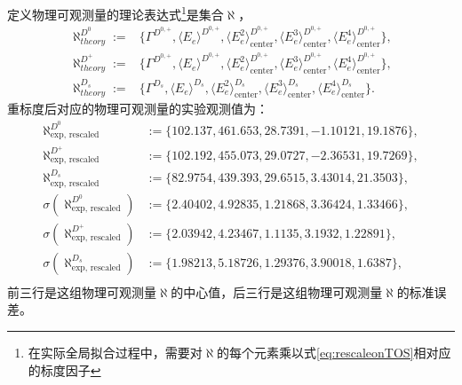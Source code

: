 定义物理可观测量的理论表达式\footnote{在实际全局拟合过程中，需要对$\aleph$的每个元素乘以式\eqref{eq:rescaleonTOS}相对应的标度因子}是集合$\aleph$，
\begin{equation}
    \begin{aligned}
        \aleph_{theory}^{D^{0}} := & \{\Gamma^{D^{0,+}}, \langle E_{e}\rangle^{D^{0,+}}, \langle E_{e}^2\rangle^{D^{0,+}}_{\text{center}}, \langle E_{e}^3\rangle^{D^{0,+}}_{\text{center}}, \langle E_{e}^4\rangle^{D^{0,+}}_{\text{center}}\}, \\
        \aleph_{theory}^{D^{+}} := & \{\Gamma^{D^{0,+}}, \langle E_{e}\rangle^{D^{0,+}}, \langle E_{e}^2\rangle^{D^{0,+}}_{\text{center}}, \langle E_{e}^3\rangle^{D^{0,+}}_{\text{center}}, \langle E_{e}^4\rangle^{D^{0,+}}_{\text{center}}\}, \\
        \aleph_{theory}^{D_s} := & \{\Gamma^{D_{s}},\langle E_{e}\rangle^{D_{s}}, \langle E_{e}^2\rangle^{D_{s}}_{\text{center}}, \langle E_{e}^3\rangle^{D_{s}}_{\text{center}}, \langle E_{e}^4\rangle^{D_{s}}_{\text{center}}\}.
    \end{aligned}
    \label{eq:TOS}
\end{equation}
重标度后对应的物理可观测量的实验观测值为：
\begin{equation}
    \begin{aligned}
        \aleph_{\text{exp, rescaled}}^{D^0} &:= \{102.137,461.653,28.7391,-1.10121,19.1876\}, \\
        \aleph_{\text{exp, rescaled}}^{D^+} &:=\{102.192,455.073,29.0727,-2.36531,19.7269\},\\
        \aleph_{\text{exp, rescaled}}^{D_s} &:=\{82.9754,439.393,29.6515,3.43014,21.3503\},\\
        \sigma(\aleph_{\text{exp, rescaled}}^{D^0})&:=\{2.40402,4.92835,1.21868,3.36424,1.33466\},\\
        \sigma(\aleph_{\text{exp, rescaled}}^{D^+})&:=\{2.03942,4.23467,1.1135,3.1932,1.22891\},\\
        \sigma(\aleph_{\text{exp, rescaled}}^{D_s})&:=\{1.98213,5.18726,1.29376,3.90018,1.6387\},\\
    \end{aligned}
    \label{eq:expdata}
\end{equation}
前三行是这组物理可观测量$\aleph$的中心值，后三行是这组物理可观测量$\aleph$的标准误差。

